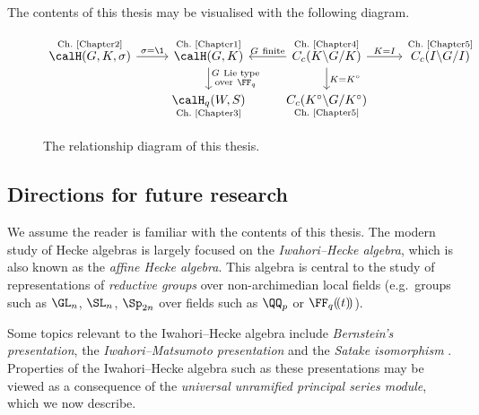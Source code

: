 \documentclass[11pt]{amsart}
\theoremstyle{remark}
\begin{document}
The contents of this thesis may be visualised with the following diagram.
\begin{figure}[H]
	\[
		\begin{tikzcd}
			{\overset{\text{Ch.\ \ref{Chapter2}}}{\calH(G,K,\sigma)}} & {\overset{\text{Ch.\ \ref{Chapter1}}}{\calH(G,K)}} & {\overset{\text{Ch.\ \ref{Chapter4}}}{C_c(K\backslash G/K)}} & {\overset{\text{Ch.\ \ref{Chapter5}}}{C_c(I\backslash G/I)}} \\
			& {\underset{\text{Ch.\ \ref{Chapter3}}}{\calH_q(W,S)}} & {\underset{\text{Ch.\ \ref{Chapter5}}}{C_c(K^\circ\backslash G/K^\circ)}}
			\arrow["{K=K^\circ}", from=1-3, to=2-3]
			\arrow["{G\ \text{finite}}"', from=1-3, to=1-2]
			\arrow["{K=I}", from=1-3, to=1-4]
			\arrow["{\substack{G\ \text{Lie type}\\ \text{over}\ \FF_q}}", from=1-2, to=2-2]
			\arrow["{\sigma=\1}", from=1-1, to=1-2]
		\end{tikzcd}
	\]
	\caption{The relationship diagram of this thesis.}
\end{figure}


\subsection*{Directions for future research}
We assume the reader is familiar with the contents of this thesis.
The modern study of Hecke algebras is largely focused on the \emph{Iwahori--Hecke algebra}, which is also known as the \emph{affine Hecke algebra}.
This algebra is central to the study of representations of \emph{reductive groups} over non-archimedian local fields (e.g.\ groups such as $\GL_n$, $\SL_n$, $\Sp_{2n}$ over fields such as $\QQ_p$ or $\FF_q(\!(t)\!)$).

Some topics relevant to the Iwahori--Hecke algebra include \emph{Bernstein's presentation}, the \emph{Iwahori--Matsumoto presentation} and the \emph{Satake isomorphism} \cite{HKP}.
Properties of the Iwahori--Hecke algebra such as these presentations may be viewed as a consequence of the \emph{universal unramified principal series module}, which we now describe.
\end{document}
